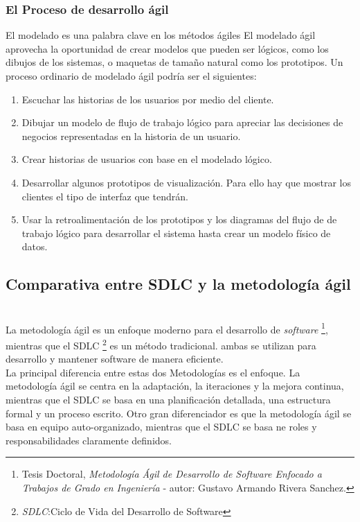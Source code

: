 \documentclass[12pt]{article}
\begin{document}
\vspace{1cm}
\subsubsection{ El Proceso de desarrollo ágil} 
El modelado es una palabra clave en los métodos ágiles El modelado ágil aprovecha
la oportunidad de crear modelos que pueden ser lógicos, como los dibujos de los
sistemas, o maquetas de tamaño natural como los prototipos. Un proceso ordinario
de modelado ágil podría ser el siguientes:\\

\begin{enumerate}
  \item Escuchar las historias de los usuarios por medio del cliente.
  \item Dibujar un modelo de flujo de trabajo lógico para apreciar las
    decisiones de negocios representadas en la historia de un usuario.
  \item Crear historias de usuarios con base en el modelado lógico.
  \item Desarrollar algunos prototipos de visualización. Para ello hay que mostrar
    los clientes el tipo de interfaz que tendrán.
  \item Usar la retroalimentación de los prototipos y los diagramas del flujo de 
    de trabajo lógico para desarrollar el sistema hasta crear un modelo físico de 
    datos.
\end{enumerate}

\vspace{1cm}
\subsection{Comparativa entre SDLC y la metodología ágil}\\ 

La metodología ágil es un enfoque moderno para el desarrollo de \textit{software} 
\footnote{Tesis Doctoral, \textit{Metodología Ágil de Desarrollo de Software Enfocado a Trabajos de Grado en Ingeniería} - autor: Gustavo Armando Rivera Sanchez.}, mientras que el SDLC \footnote{ \textit{SDLC}:Ciclo de Vida del Desarrollo de Software} es un método tradicional. ambas se utilizan para desarrollo y mantener software de manera eficiente.\\

La principal diferencia entre estas dos Metodologías es el enfoque. La metodología ágil se centra en la adaptación, la iteraciones y la mejora continua, mientras que el SDLC se basa en una planificación detallada, una estructura formal y un proceso escrito. Otro gran diferenciador es que la metodología ágil se basa en equipo auto-organizado, mientras que el SDLC se basa ne roles y responsabilidades claramente definidos.\\
\end{document}
